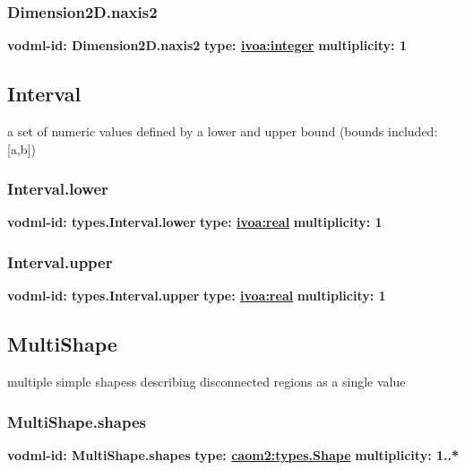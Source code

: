     \subsubsection{Dimension2D.naxis2}
      \textbf{vodml-id: Dimension2D.naxis2} \newline
      \textbf{type: \hyperref[sect:ivoa]{ivoa:integer}} \newline
      \textbf{multiplicity: 1} 

  \subsection{Interval}
  \label{sect:types.Interval}
    a set of numeric values defined by a lower and upper bound (bounds included: [a,b])

    \subsubsection{Interval.lower}
      \textbf{vodml-id: types.Interval.lower} \newline
      \textbf{type: \hyperref[sect:ivoa]{ivoa:real}} \newline
      \textbf{multiplicity: 1} 

    \subsubsection{Interval.upper}
      \textbf{vodml-id: types.Interval.upper} \newline
      \textbf{type: \hyperref[sect:ivoa]{ivoa:real}} \newline
      \textbf{multiplicity: 1} 

  \subsection{MultiShape}
  \label{sect:types.MultiShape}
    multiple simple shapess describing disconnected regions as a single value

    \subsubsection{MultiShape.shapes}
      \textbf{vodml-id: MultiShape.shapes} \newline
      \textbf{type: \hyperref[sect:types.Shape]{caom2:types.Shape}} \newline
      \textbf{multiplicity: 1..*} 

